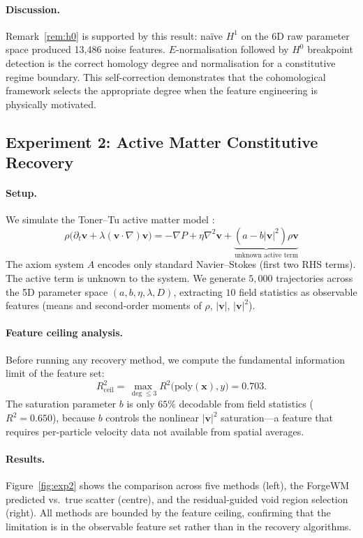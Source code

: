 \documentclass[twoside,11pt]{article}
\begin{document}
\paragraph{Discussion.}
Remark~\ref{rem:h0} is supported by this result: na\"ive $H^1$
on the 6D raw parameter space produced 13,486 noise features.
$E$-normalisation followed by $H^0$ breakpoint detection is the
correct homology degree and normalisation for a constitutive regime
boundary. This self-correction demonstrates that the cohomological
framework selects the appropriate degree when the feature engineering
is physically motivated.

\subsection{Experiment 2: Active Matter Constitutive Recovery}
\label{sec:exp2}

\paragraph{Setup.}
We simulate the Toner--Tu active matter model \citep{toner1995longrange}:
\[
  \rho\bigl(\partial_t \mathbf{v}
    + \lambda(\mathbf{v}\cdot\nabla)\mathbf{v}\bigr)
  = -\nabla P + \eta\nabla^2\mathbf{v}
    + \underbrace{(a - b|\mathbf{v}|^2)\rho\mathbf{v}}_{\text{unknown active term}}
\]
The axiom system $A$ encodes only standard Navier--Stokes (first two
RHS terms). The active term is unknown to the system. We generate
$5{,}000$ trajectories across the 5D parameter space
$(a, b, \eta, \lambda, D)$, extracting $10$ field statistics as
observable features (means and second-order moments of $\rho$,
$|\mathbf{v}|$, $|\mathbf{v}|^2$).

\paragraph{Feature ceiling analysis.}
Before running any recovery method, we compute the fundamental
information limit of the feature set:
\[
  R^2_{\mathrm{ceil}}
  = \max_{\deg \leq 3} R^2\bigl(\text{poly}(\mathbf{x}), y\bigr)
  = 0.703.
\]
The saturation parameter $b$ is only $65\%$ decodable from field
statistics ($R^2 = 0.650$), because $b$ controls the nonlinear
$|\mathbf{v}|^2$ saturation---a feature that requires per-particle
velocity data not available from spatial averages.

\paragraph{Results.}
Figure~\ref{fig:exp2} shows the comparison across five methods
(left), the ForgeWM predicted vs.\ true scatter (centre), and the
residual-guided void region selection (right). All methods are
bounded by the feature ceiling, confirming that the limitation is
in the observable feature set rather than in the recovery algorithms.
\end{document}
